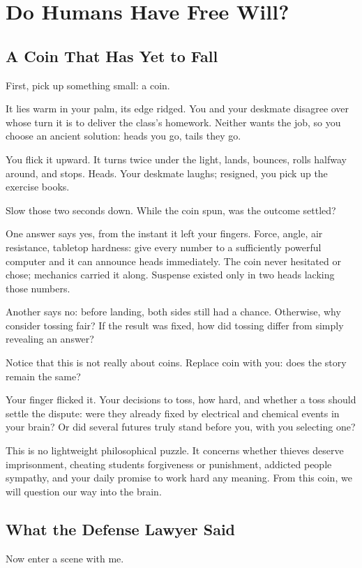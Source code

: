 \chapter{Do Humans Have Free Will?}
\section{A Coin That Has Yet to Fall}
First, pick up something small: a coin.

It lies warm in your palm, its edge ridged. You and your deskmate disagree over whose turn it is to deliver the class's homework. Neither wants the job, so you choose an ancient solution: heads you go, tails they go.

You flick it upward. It turns twice under the light, lands, bounces, rolls halfway around, and stops. Heads. Your deskmate laughs; resigned, you pick up the exercise books.

Slow those two seconds down. While the coin spun, was the outcome settled?

One answer says yes, from the instant it left your fingers. Force, angle, air resistance, tabletop hardness: give every number to a sufficiently powerful computer and it can announce heads immediately. The coin never hesitated or chose; mechanics carried it along. Suspense existed only in two heads lacking those numbers.

Another says no: before landing, both sides still had a chance. Otherwise, why consider tossing fair? If the result was fixed, how did tossing differ from simply revealing an answer?

Notice that this is not really about coins. Replace coin with you: does the story remain the same?

Your finger flicked it. Your decisions to toss, how hard, and whether a toss should settle the dispute: were they already fixed by electrical and chemical events in your brain? Or did several futures truly stand before you, with you selecting one?

This is no lightweight philosophical puzzle. It concerns whether thieves deserve imprisonment, cheating students forgiveness or punishment, addicted people sympathy, and your daily promise to work hard any meaning. From this coin, we will question our way into the brain.

\section{What the Defense Lawyer Said}
Now enter a scene with me.

